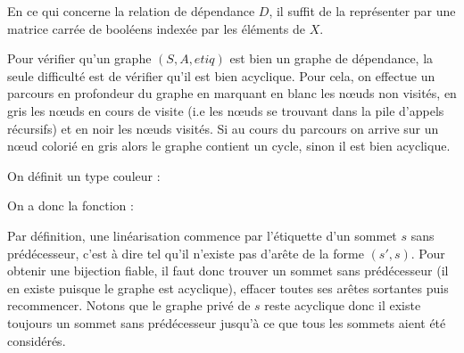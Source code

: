 En ce qui concerne la relation de dépendance $D$, il suffit de la représenter par une matrice carrée de booléens indexée par les éléments de $X$.
\medskip

Pour vérifier qu'un graphe $(S,A,etiq)$ est bien un graphe de dépendance, la seule difficulté est de vérifier qu'il est bien acyclique. Pour cela, on effectue un parcours en profondeur du graphe en marquant en blanc les nœuds non visités, en gris les nœuds en cours de visite (i.e les nœuds se trouvant dans la pile d'appels récursifs) et en noir les nœuds visités. Si au cours du parcours on arrive sur un nœud colorié en gris alors le graphe contient un cycle, sinon il est bien acyclique.
\medskip

On définit un type couleur :





On a donc la fonction :



\Q
Par définition, une linéarisation commence par l'étiquette d'un sommet $s$ sans prédécesseur, c'est à dire tel qu'il n'existe pas d'arête de la forme $(s',s)$. Pour obtenir une bijection fiable, il faut donc trouver un sommet sans prédécesseur (il en existe puisque le graphe est acyclique), effacer toutes ses arêtes sortantes puis recommencer. Notons que le graphe privé de $s$ reste acyclique donc il existe toujours un sommet sans prédécesseur jusqu'à ce que tous les sommets aient été considérés.



\Fin
